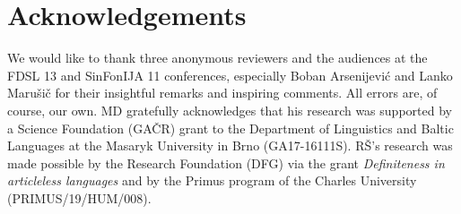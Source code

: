 \documentclass[output=paper,colorlinks,citecolor=brown,newtxmath]{langscibook}
\begin{document}
\section*{Acknowledgements}
We would like to thank three anonymous reviewers and the audiences at the FDSL 13 and SinFonIJA 11 conferences, especially Boban Arsenijević and Lanko Marušič for their insightful remarks and inspiring comments. All errors are, of course, our own. MD gratefully acknowledges that his research was supported by a  Science Foundation (GAČR) grant to the Department of Linguistics and Baltic Languages at the Masaryk University in Brno (GA17-16111S). RŠ's research was made possible by the  Research Foundation (DFG) via the grant \textit{Definiteness in articleless  languages} and by the Primus program of the Charles University (PRIMUS/19/HUM/008).

\sloppy
\printbibliography[heading=subbibliography,notkeyword=this]
\end{document}
